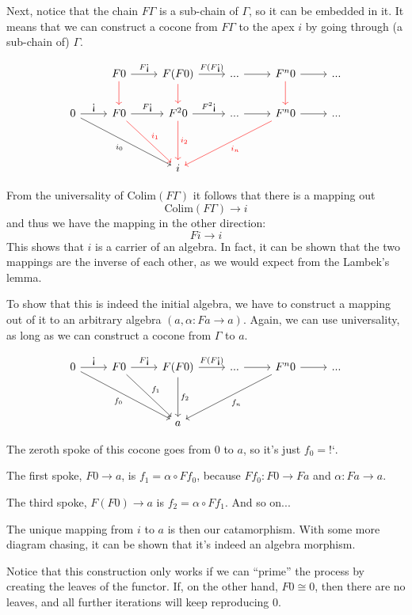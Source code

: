 \documentclass[DaoFP]{subfiles}
\begin{document}
Next, notice that the chain $F \Gamma$ is a sub-chain of $\Gamma$, so it can be embedded in it. It means that we can construct a cocone from $F \Gamma$ to the apex $i$ by going through (a sub-chain of) $\Gamma$. 

\[
 \begin{tikzcd}
 & F 0
  \arrow[r, "F\mbox{!`}"]
  \arrow[d, red]
& F (F 0)
  \arrow[r, "F(F\mbox{!`})"]
  \arrow[d, red]
 & ...
 \arrow[r]
 & F^{n} 0
  \arrow[r]
  \arrow[d, red]
 & ...
 \\
  0
 \arrow[r, "\mbox{!`}"]
 \arrow[ddrr,  "i_0"']
 &  F 0
  \arrow[r, "F  \mbox{!`}"]
 \arrow[ddr, red, "i_1"]
& F^2 0
  \arrow[r, "F^2\mbox{!`}"]
  \arrow[dd, red, "i_2"]
 & ...
 \arrow[r]
 & F^n 0
  \arrow[r]
 \arrow[ddll, red, "i_n"]
 & ...
 \\
 \\
 &&i
  \end{tikzcd}
\]


From the universality of $\text{Colim} (F \Gamma)$ it follows that there is a mapping out 
\[\text{Colim} (F \Gamma) \to i \]
and thus we have the mapping in the other direction:
\[ F i \to i \]
This shows that $i$ is a carrier of an algebra. In fact, it can be shown that the two mappings are the inverse of each other, as we would expect from the Lambek's lemma.

To show that this is indeed the initial algebra, we have to construct a mapping out of it to an arbitrary algebra $(a, \alpha \colon F a \to a)$. Again, we can use universality, as long as we can construct a cocone from $\Gamma$ to $a$. 

\[
 \begin{tikzcd}
 0
 \arrow[r, "\mbox{!`}"]
 \arrow[ddrr, "f_0"']
 & F 0
  \arrow[r, "F\mbox{!`}"]
 \arrow[ddr, "f_1"]
& F (F 0)
  \arrow[r, "F(F\mbox{!`})"]
  \arrow[dd, "f_2"]
 & ...
 \arrow[r]
 & F^n 0
  \arrow[r]
 \arrow[ddll, "f_n"]
 & ...
 \\
 \\
 &&a
  \end{tikzcd}
\]


The zeroth spoke of this cocone goes from $0$ to $a$, so it's just $f_0 = \mbox{!`}$.

The first spoke, $F 0 \to a$, is $f_1 = \alpha \circ F f_0$, because $F f_0 \colon F 0 \to F a$ and $\alpha \colon F a \to a$.

The third spoke, $F (F 0) \to a$ is  $f_2 = \alpha \circ F f_1$.  And so on...

The unique mapping from $i$ to $a$ is then our catamorphism. With some more diagram chasing, it can be shown that it's indeed an algebra morphism. 

Notice that this construction only works if we can ``prime'' the process by creating the leaves of the functor. If, on the other hand, $F 0 \cong 0$, then there are no leaves, and all further iterations will keep reproducing $0$. 
\end{document}

